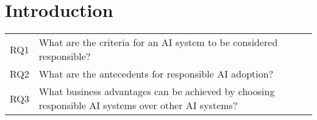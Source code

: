 \section{Introduction}
\label{sec:Introduction}





\begin{table}[h]
    \centering
    \begin{tabular}{cp{}}
        RQ1 & What are the criteria for an AI system to be considered responsible? \\
        RQ2 & What are the antecedents for responsible AI adoption? \\
        RQ3 & What business advantages can be achieved by choosing responsible AI systems over other AI systems? \\
    \end{tabular}
\end{table}

